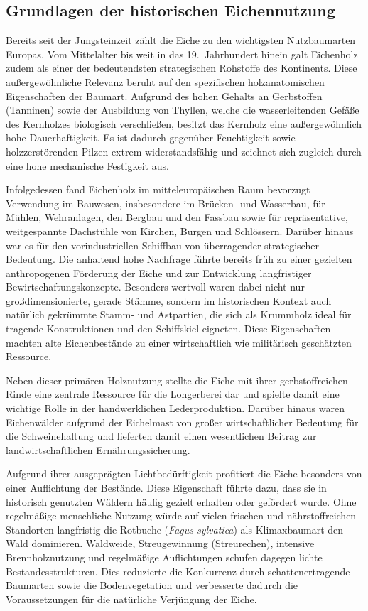 \documentclass[twocolumn, bibliography=totoc, abstract=true]{scrartcl}
\begin{document}
\subsection{Grundlagen der historischen Eichennutzung}

Bereits seit der Jungsteinzeit zählt die Eiche zu den wichtigsten Nutzbaumarten Europas. Vom Mittelalter bis weit in das 19.~Jahrhundert hinein galt Eichenholz zudem als einer der bedeutendsten strategischen Rohstoffe des Kontinents. Diese außergewöhnliche Relevanz beruht auf den spezifischen holzanatomischen Eigenschaften der Baumart. Aufgrund des hohen Gehalts an Gerbstoffen (Tanninen) sowie der Ausbildung von Thyllen, welche die wasserleitenden Gefäße des Kernholzes biologisch verschließen, besitzt das Kernholz eine außergewöhnlich hohe Dauerhaftigkeit. Es ist dadurch gegenüber Feuchtigkeit sowie holzzerstörenden Pilzen extrem widerstandsfähig und zeichnet sich zugleich durch eine hohe mechanische Festigkeit aus.

Infolgedessen fand Eichenholz im mitteleuropäischen Raum bevorzugt Verwendung im Bauwesen, insbesondere im Brücken- und Wasserbau, für Mühlen, Wehranlagen, den Bergbau und den Fassbau sowie für repräsentative, weitgespannte Dachstühle von Kirchen, Burgen und Schlössern. Darüber hinaus war es für den vorindustriellen Schiffbau von überragender strategischer Bedeutung. Die anhaltend hohe Nachfrage führte bereits früh zu einer gezielten anthropogenen Förderung der Eiche und zur Entwicklung langfristiger Bewirtschaftungskonzepte. Besonders wertvoll waren dabei nicht nur großdimensionierte, gerade Stämme, sondern im historischen Kontext auch natürlich gekrümmte Stamm- und Astpartien, die sich als Krummholz ideal für tragende Konstruktionen und den Schiffskiel eigneten. Diese Eigenschaften machten alte Eichenbestände zu einer wirtschaftlich wie militärisch geschätzten Ressource.

Neben dieser primären Holznutzung stellte die Eiche mit ihrer gerbstoffreichen Rinde eine zentrale Ressource für die Lohgerberei dar und spielte damit eine wichtige Rolle in der handwerklichen Lederproduktion. Darüber hinaus waren Eichenwälder aufgrund der Eichelmast von großer wirtschaftlicher Bedeutung für die Schweinehaltung und lieferten damit einen wesentlichen Beitrag zur landwirtschaftlichen Ernährungssicherung.

Aufgrund ihrer ausgeprägten Lichtbedürftigkeit profitiert die Eiche besonders von einer Auflichtung der Bestände. Diese Eigenschaft führte dazu, dass sie in historisch genutzten Wäldern häufig gezielt erhalten oder gefördert wurde. Ohne regelmäßige menschliche Nutzung würde auf vielen frischen und nährstoffreichen Standorten langfristig die Rotbuche (\textit{Fagus sylvatica}) als Klimaxbaumart den Wald dominieren. Waldweide, Streugewinnung (Streurechen), intensive Brennholznutzung und regelmäßige Auflichtungen schufen dagegen lichte Bestandesstrukturen. Dies reduzierte die Konkurrenz durch schattenertragende Baumarten sowie die Bodenvegetation und verbesserte dadurch die Voraussetzungen für die natürliche Verjüngung der Eiche.
\end{document}
